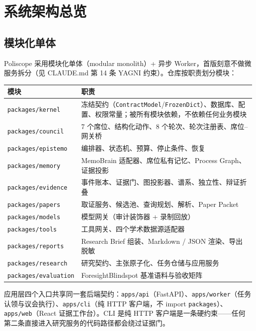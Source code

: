 \section{系统架构总览}

\subsection{模块化单体}

Poliscope 采用模块化单体（modular monolith）+ 异步 Worker，首版刻意不做微服务拆分（见 CLAUDE.md 第 14 条 YAGNI 约束）。仓库按职责划分模块：

\begin{table}[h]
\centering
\small
\begin{tabular}{@{}ll@{}}
\toprule
\textbf{模块} & \textbf{职责} \\
\midrule
\texttt{packages/kernel} & 冻结契约（\texttt{ContractModel}/\texttt{FrozenDict}）、数据库、配置、权限常量；被所有模块依赖，不依赖任何业务模块 \\
\texttt{packages/council} & 7 个席位、结构化动作、8 个轮次、轮次注册表、席位--网关桥 \\
\texttt{packages/epistemo} & 编排器、状态机、预算、停止条件、恢复 \\
\texttt{packages/memory} & MemoBrain 适配器、席位私有记忆、Process Graph、证据投影 \\
\texttt{packages/evidence} & 事件账本、证据门、图投影器、谱系、独立性、辩证折叠 \\
\texttt{packages/papers} & 取证服务、候选池、查询规划、解析、Paper Packet \\
\texttt{packages/models} & 模型网关（审计装饰器 + 录制回放） \\
\texttt{packages/tools} & 工具网关、四个学术数据源适配器 \\
\texttt{packages/reports} & Research Brief 组装、Markdown / JSON 渲染、导出脱敏 \\
\texttt{packages/research} & 研究契约、主张原子化、任务仓储与应用服务 \\
\texttt{packages/evaluation} & ForesightBlindspot 基准语料与验收矩阵 \\
\bottomrule
\end{tabular}
\end{table}

应用层四个入口共享同一套后端契约：\texttt{apps/api}（FastAPI）、\texttt{apps/worker}（任务认领与议会执行）、\texttt{apps/cli}（纯 HTTP 客户端，不 import \texttt{packages}）、\texttt{apps/web}（React 证据工作台）。CLI 是纯 HTTP 客户端是一条硬约束——任何第二条直接进入研究服务的代码路径都会绕过证据门。

